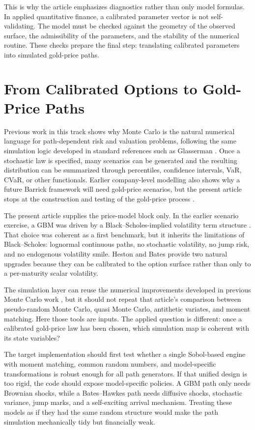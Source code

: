 \documentclass[a4paper,10pt,titlepage,oneside,openany]{book}
\theoremstyle{plain}
\theoremstyle{definition}
\theoremstyle{remark}
\begin{document}
This is why the article emphasizes diagnostics rather than only model formulas. In applied quantitative finance, a calibrated parameter vector is not self-validating. The model must be checked against the geometry of the observed surface, the admissibility of the parameters, and the stability of the numerical routine. These checks prepare the final step: translating calibrated parameters into simulated gold-price paths.


\section{From Calibrated Options to Gold-Price Paths}

Previous work in this track shows why Monte Carlo is the natural numerical language for path-dependent risk and valuation problems, following the same simulation logic developed in standard references such as Glasserman \cite{Glasserman2003,BarrickArticle3}. Once a stochastic law is specified, many scenarios can be generated and the resulting distribution can be summarized through percentiles, confidence intervals, VaR, CVaR, or other functionals. Earlier company-level modelling also shows why a future Barrick framework will need gold-price scenarios, but the present article stops at the construction and testing of the gold-price process \cite{BarrickArticle4,BarrickArticle5}.

The present article supplies the price-model block only. In the earlier scenario exercise, a GBM was driven by a Black--Scholes-implied volatility term structure \cite{BarrickArticle4}. That choice was coherent as a first benchmark, but it inherits the limitations of Black--Scholes: lognormal continuous paths, no stochastic volatility, no jump risk, and no endogenous volatility smile. Heston and Bates provide two natural upgrades because they can be calibrated to the option surface rather than only to a per-maturity scalar volatility.

The simulation layer can reuse the numerical improvements developed in previous Monte Carlo work \cite{BarrickArticle3}, but it should not repeat that article's comparison between pseudo-random Monte Carlo, quasi Monte Carlo, antithetic variates, and moment matching. Here those tools are inputs. The applied question is different: once a calibrated gold-price law has been chosen, which simulation map is coherent with its state variables?

The target implementation should first test whether a single Sobol-based engine with moment matching, common random numbers, and model-specific transformations is robust enough for all path generators. If that unified design is too rigid, the code should expose model-specific policies. A GBM path only needs Brownian shocks, while a Bates--Hawkes path needs diffusive shocks, stochastic variance, jump marks, and a self-exciting arrival mechanism. Treating these models as if they had the same random structure would make the path simulation mechanically tidy but financially weak.
\end{document}
